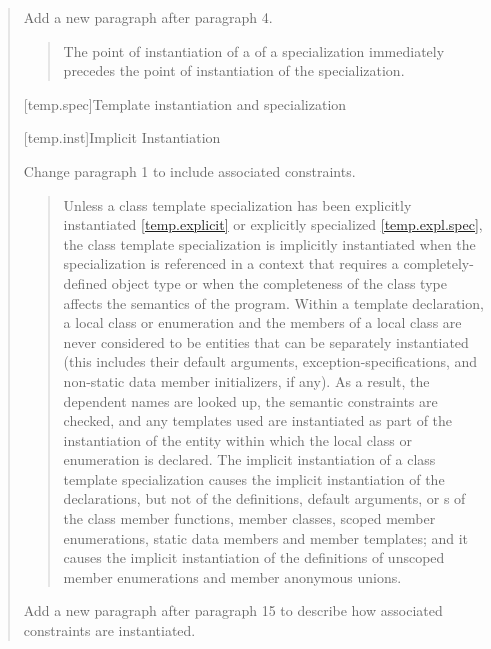\begin{quote}
Add a new paragraph after paragraph 4.

\begin{quote}
\setcounter{Paras}{4}
\pnum
The point of instantiation of a  of a
specialization immediately precedes the point of instantiation of
the specialization.
\end{quote}


[temp.spec]{Template instantiation and specialization}

[temp.inst]{Implicit Instantiation}
    
Change paragraph 1 to include associated constraints.

\begin{quote}
Unless a class template specialization has been explicitly
instantiated \ref{temp.explicit} or explicitly specialized \ref{temp.expl.spec}, 
the class template specialization is implicitly instantiated when the
specialization is referenced in a context that requires a
completely-defined object type or when the completeness of the
class type affects the semantics of the program. 
% 
\enternote
Within a template declaration, a local class or enumeration and the members
of a local class are never considered to be entities that can be
separately instantiated (this includes their default arguments,
exception-specifications, and non-static data member initializers, if any). 
% 
As a result, the dependent names are looked up, the semantic constraints 
are checked, and any templates used are instantiated as part of the
instantiation of the entity within which the local class or enumeration is 
declared.
\exitnote
% 
The implicit instantiation of a class template specialization causes the 
implicit instantiation of the declarations, but not of the definitions, default
arguments,  or
s of the class member functions,
member classes, scoped member enumerations, static data members and
member templates; and it causes the implicit instantiation of the
definitions of unscoped member enumerations and member anonymous
unions.
\end{quote}


Add a new paragraph after paragraph 15 to describe how associated
constraints are instantiated.


\end{quote}
